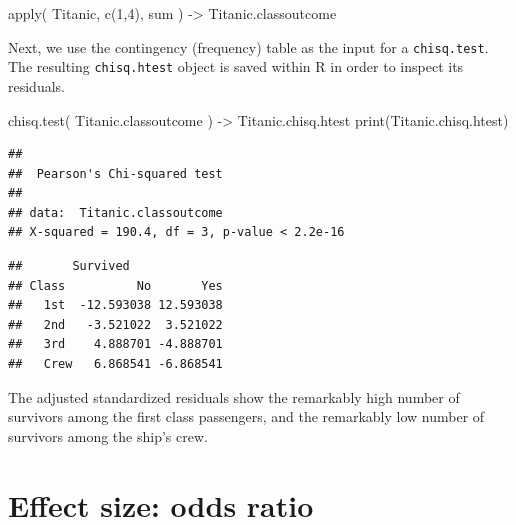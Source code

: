 \documentclass[
]{book}
\newenvironment{Shaded}{\begin{snugshade}}{\end{snugshade}}
\newcommand{\CommentTok}[1]{\textcolor[rgb]{0.56,0.35,0.01}{\textit{#1}}}
\newcommand{\DecValTok}[1]{\textcolor[rgb]{0.00,0.00,0.81}{#1}}
\newcommand{\FunctionTok}[1]{\textcolor[rgb]{0.00,0.00,0.00}{#1}}
\newcommand{\NormalTok}[1]{#1}
\newcommand{\OtherTok}[1]{\textcolor[rgb]{0.56,0.35,0.01}{#1}}
\newcommand{\SpecialCharTok}[1]{\textcolor[rgb]{0.00,0.00,0.00}{#1}}
\begin{document}
\begin{Shaded}
\begin{Highlighting}[]
\FunctionTok{apply}\NormalTok{( Titanic, }\FunctionTok{c}\NormalTok{(}\DecValTok{1}\NormalTok{,}\DecValTok{4}\NormalTok{), sum ) }\OtherTok{{-}\textgreater{}}\NormalTok{ Titanic.classoutcome}
\end{Highlighting}
\end{Shaded}

Next, we use the contingency (frequency) table as the input for a \texttt{chisq.test}.
The resulting \texttt{chisq.htest} object is saved within R in order to inspect its residuals.

\begin{Shaded}
\begin{Highlighting}[]
\FunctionTok{chisq.test}\NormalTok{( Titanic.classoutcome ) }\OtherTok{{-}\textgreater{}}\NormalTok{ Titanic.chisq.htest}
\FunctionTok{print}\NormalTok{(Titanic.chisq.htest)}
\end{Highlighting}
\end{Shaded}

\begin{verbatim}
## 
##  Pearson's Chi-squared test
## 
## data:  Titanic.classoutcome
## X-squared = 190.4, df = 3, p-value < 2.2e-16
\end{verbatim}

\begin{Shaded}
\end{Shaded}

\begin{verbatim}
##       Survived
## Class          No       Yes
##   1st  -12.593038 12.593038
##   2nd   -3.521022  3.521022
##   3rd    4.888701 -4.888701
##   Crew   6.868541 -6.868541
\end{verbatim}

The adjusted standardized residuals show the remarkably high number of survivors among the first class passengers, and the remarkably low number of survivors among the ship's crew.

\hypertarget{effect-size-odds-ratio}{%
\section{Effect size: odds ratio}\label{effect-size-odds-ratio}}
\end{document}
